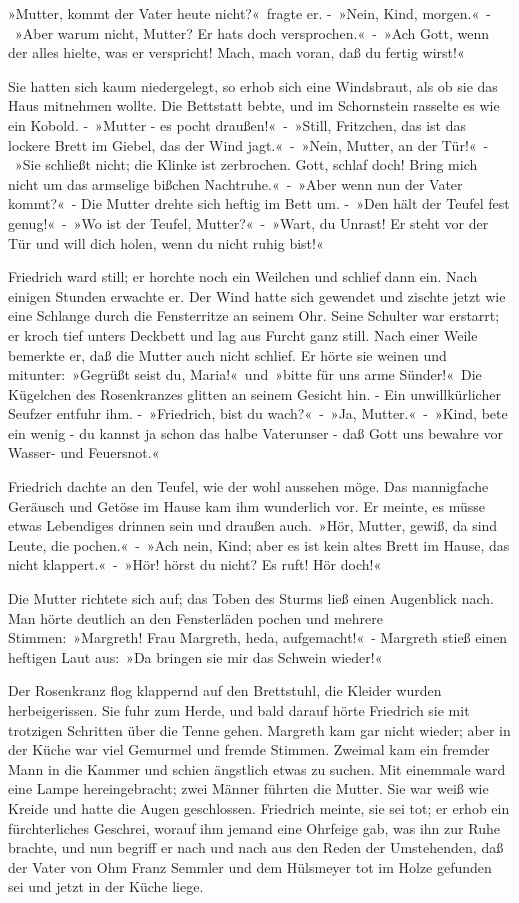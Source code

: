 »Mutter, kommt der Vater heute nicht?« fragte er. - »Nein, Kind, morgen.« - »Aber warum nicht, Mutter? Er hats doch versprochen.« - »Ach Gott, wenn der alles hielte, was er verspricht! Mach, mach voran, daß du fertig wirst!«

Sie hatten sich kaum niedergelegt, so erhob sich eine Windsbraut, als ob sie das Haus mitnehmen wollte. Die Bettstatt bebte, und im Schornstein rasselte es wie ein Kobold. - »Mutter - es pocht draußen!« - »Still, Fritzchen, das ist das lockere Brett im Giebel, das der Wind jagt.« - »Nein, Mutter, an der Tür!« - »Sie schließt nicht; die Klinke ist zerbrochen. Gott, schlaf doch! Bring mich nicht um das armselige bißchen Nachtruhe.« - »Aber wenn nun der Vater kommt?« - Die Mutter drehte sich heftig im Bett um. - »Den hält der Teufel fest genug!« - »Wo ist der Teufel, Mutter?« - »Wart, du Unrast! Er steht vor der Tür und will dich holen, wenn du nicht ruhig bist!«

Friedrich ward still; er horchte noch ein Weilchen und schlief dann ein. Nach einigen Stunden erwachte er. Der Wind hatte sich gewendet und zischte jetzt wie eine Schlange durch die Fensterritze an seinem Ohr. Seine Schulter war erstarrt; er kroch tief unters Deckbett und lag aus Furcht ganz still. Nach einer Weile bemerkte er, daß die Mutter auch nicht schlief. Er hörte sie weinen und mitunter: »Gegrüßt seist du, Maria!« und »bitte für uns arme Sünder!« Die Kügelchen des Rosenkranzes glitten an seinem Gesicht hin. - Ein unwillkürlicher Seufzer entfuhr ihm. - »Friedrich, bist du wach?« - »Ja, Mutter.« - »Kind, bete ein wenig - du kannst ja schon das halbe Vaterunser - daß Gott uns bewahre vor Wasser- und Feuersnot.«

Friedrich dachte an den Teufel, wie der wohl aussehen möge. Das mannigfache Geräusch und Getöse im Hause kam ihm wunderlich vor. Er meinte, es müsse etwas Lebendiges drinnen sein und draußen auch. »Hör, Mutter, gewiß, da sind Leute, die pochen.« - »Ach nein, Kind; aber es ist kein altes Brett im Hause, das nicht klappert.« - »Hör! hörst du nicht? Es ruft! Hör doch!«

Die Mutter richtete sich auf; das Toben des Sturms ließ einen Augenblick nach. Man hörte deutlich an den Fensterläden pochen und mehrere Stimmen: »Margreth! Frau Margreth, heda, aufgemacht!« - Margreth stieß einen heftigen Laut aus: »Da bringen sie mir das Schwein wieder!«

Der Rosenkranz flog klappernd auf den Brettstuhl, die Kleider wurden herbeigerissen. Sie fuhr zum Herde, und bald darauf hörte Friedrich sie mit trotzigen Schritten über die Tenne gehen. Margreth kam gar nicht wieder; aber in der Küche war viel Gemurmel und fremde Stimmen. Zweimal kam ein fremder Mann in die Kammer und schien ängstlich etwas zu suchen. Mit einemmale ward eine Lampe hereingebracht; zwei Männer führten die Mutter. Sie war weiß wie Kreide und hatte die Augen geschlossen. Friedrich meinte, sie sei tot; er erhob ein fürchterliches Geschrei, worauf ihm jemand eine Ohrfeige gab, was ihn zur Ruhe brachte, und nun begriff er nach und nach aus den Reden der Umstehenden, daß der Vater von Ohm Franz Semmler und dem Hülsmeyer tot im Holze gefunden sei und jetzt in der Küche liege.

